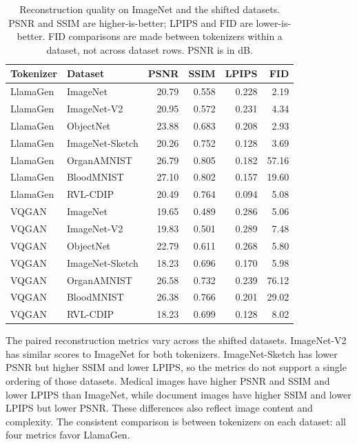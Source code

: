 \begin{table}[t]
    \centering
    \scriptsize
    \setlength{\tabcolsep}{4pt}
    \begin{tabular}{llrrrr}
        \textbf{Tokenizer} & \textbf{Dataset} & \textbf{PSNR} & \textbf{SSIM} & \textbf{LPIPS} & \textbf{FID} \\ \hline
        LlamaGen & ImageNet         & 20.79 & 0.558 & 0.228 & 2.19 \\
        LlamaGen & ImageNet-V2      & 20.95 & 0.572 & 0.231 & 4.34 \\
        LlamaGen & ObjectNet        & 23.88 & 0.683 & 0.208 & 2.93 \\
        LlamaGen & ImageNet-Sketch  & 20.26 & 0.752 & 0.128 & 3.69 \\
        LlamaGen & OrganAMNIST      & 26.79 & 0.805 & 0.182 & 57.16 \\
        LlamaGen & BloodMNIST       & 27.10 & 0.802 & 0.157 & 19.60 \\
        LlamaGen & RVL-CDIP         & 20.49 & 0.764 & 0.094 & 5.08 \\ \hline
        VQGAN & ImageNet            & 19.65 & 0.489 & 0.286 & 5.06 \\
        VQGAN & ImageNet-V2         & 19.83 & 0.501 & 0.289 & 7.48 \\
        VQGAN & ObjectNet           & 22.79 & 0.611 & 0.268 & 5.80 \\
        VQGAN & ImageNet-Sketch     & 18.23 & 0.696 & 0.170 & 5.98 \\
        VQGAN & OrganAMNIST         & 26.58 & 0.732 & 0.239 & 76.12 \\
        VQGAN & BloodMNIST          & 26.38 & 0.766 & 0.201 & 29.02 \\
        VQGAN & RVL-CDIP            & 18.23 & 0.699 & 0.128 & 8.02 \\
    \end{tabular}
    \caption{Reconstruction quality on ImageNet and the shifted datasets. PSNR
    and SSIM are higher-is-better; LPIPS and FID are lower-is-better. FID
    comparisons are made between tokenizers within a dataset, not across
    dataset rows. PSNR is in dB.}
    \label{tab:rq5_reconstruction_shift}
\end{table}

The paired reconstruction metrics vary across the shifted datasets.
ImageNet-V2 has similar scores to ImageNet for both tokenizers.
ImageNet-Sketch has lower PSNR but higher SSIM and lower LPIPS, so the
metrics do not support a single ordering of those datasets. Medical images
have higher PSNR and SSIM and lower LPIPS than ImageNet, while document
images have higher SSIM and lower LPIPS but lower PSNR. These differences
also reflect image content and complexity. The consistent comparison is
between tokenizers on each dataset: all four metrics favor LlamaGen.

